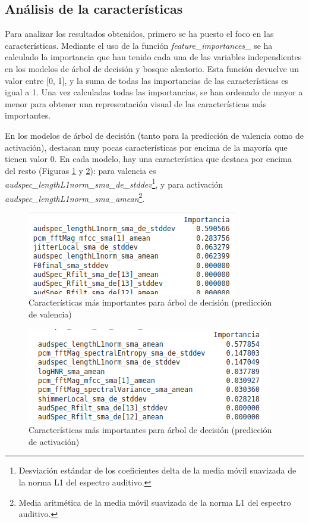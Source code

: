 \documentclass[12pt,a4paper]{article}
\begin{document}
\subsection{Análisis de la características}
Para analizar los resultados obtenidos, primero se ha puesto el foco en las características. Mediante el uso de la función \textit{feature\_importances\_} se ha calculado la importancia que han tenido cada una de las variables independientes en los modelos de árbol de decisión y bosque aleatorio. Esta función devuelve un valor entre [0, 1], y la suma de todas las importancias de las características es igual a 1. Una vez calculadas todas las importancias, se han ordenado de mayor a menor para obtener una representación visual de las características más importantes.


En los modelos de árbol de decisión (tanto para la predicción de valencia como de activación), destacan muy pocas características por encima de la mayoría que tienen valor 0. En cada modelo, hay una característica que destaca por encima del resto (Figuras \ref{fig:importtreeregval} y \ref{fig:importtreeregar}): para valencia es \textit{audspec\_lengthL1norm\_sma\_de\_stddev}\footnote{Desviación estándar de los coeficientes delta de la media móvil suavizada de la norma L1 del espectro auditivo.}, y para activación \textit{audspec\_lengthL1norm\_sma\_amean}\footnote{Media aritmética de la media móvil suavizada de la norma L1 del espectro auditivo.}.
\begin{figure}[H]
	\centering
	\includegraphics[width=0.6\linewidth]{figs/import_tree_reg_val}
	\caption{Características más importantes para árbol de decisión (predicción de valencia)}
	\label{fig:importtreeregval}
\end{figure}
\begin{figure}[H]
	\centering
	\includegraphics[width=0.7\linewidth]{figs/import_tree_reg_ar}
	\caption{Características más importantes para árbol de decisión (predicción de activación)}
	\label{fig:importtreeregar}
\end{figure}
\end{document}

